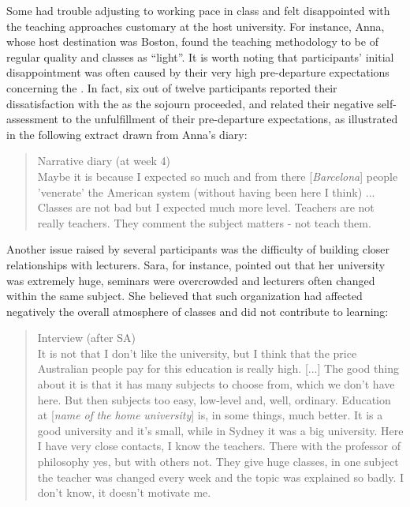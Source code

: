 \documentclass[output=paper]{langsci/langscibook}
\begin{document}
Some had trouble adjusting to working pace in class and felt disappointed with the teaching approaches customary at the host university. For instance, Anna, whose host destination was Boston, found the teaching methodology to be of regular quality and classes as “light”. It is worth noting that participants’ initial disappointment was often caused by their very high pre-departure expectations concerning the . In fact, six out of twelve participants reported their dissatisfaction with the  as the sojourn proceeded, and related their negative self-assessment to the unfulfillment of their pre-departure expectations, as illustrated in the following extract drawn from Anna’s diary: 

\begin{quote}
Narrative diary (at week 4)
\smallskip\\
Maybe it is because I expected so much and from there [\textit{Barcelona}] people 'venerate' the American system (without having been here I think) ... Classes are not bad but I expected much more level. Teachers are not really teachers. They comment the subject matters - not teach them.
\end{quote}

 Another issue raised by several participants was the difficulty of building closer relationships with lecturers. Sara, for instance, pointed out that her university was extremely huge, seminars were overcrowded and lecturers often changed within the same subject. She believed that such organization had affected negatively the overall atmosphere of classes and did not contribute to learning: 

\largerpage
\begin{quote}
Interview (after SA) 
\smallskip\\
It is not that I don’t like the university, but I think that the price Australian people pay for this education is really high. [...] The good thing about it is that it has many subjects to choose from, which we don’t have here. But then subjects too easy, low-level and, well, ordinary. Education at [\textit{name} \textit{of} \textit{the} \textit{home} \textit{university}] is, in some things, much better. It is a good university and it’s small, while in Sydney it was a big university. Here I have very close contacts, I know the teachers. There with the professor of philosophy yes, but with others not. They give huge classes, in one subject the teacher was changed every week and the topic was explained so badly. I don’t know, it doesn’t motivate me. 
\end{quote}
\end{document}
